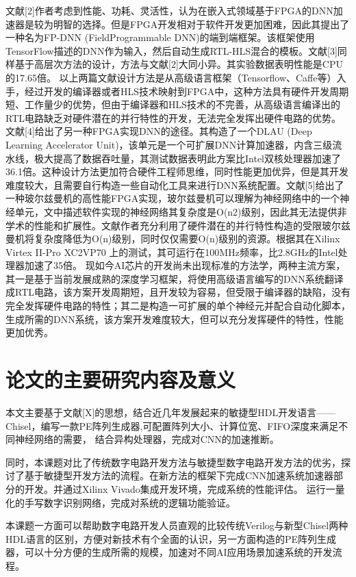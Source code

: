     文献[2]作者考虑到性能、功耗、灵活性，认为在嵌入式领域基于FPGA的DNN加速器是较为明智的选择。但是FPGA开发相对于软件开发更加困难，因此其提出了一种名为FP-DNN (FieldProgrammable DNN)的端到端框架。该框架使用TensorFlow描述的DNN作为输入，然后自动生成RTL-HLS混合的模板。文献[3]同样基于高层次方法的设计，方法与文献[2]大同小异。其实验数据表明性能是CPU的17.65倍。
    以上两篇文献设计方法是从高级语言框架（Tensorflow、Caffe等）入手，经过开发的编译器或者HLS技术映射到FPGA中，这种方法具有硬件开发周期短、工作量少的优势，但由于编译器和HLS技术的不完善，从高级语言编译出的RTL电路缺乏对硬件潜在的并行特性的开发，无法完全发挥出硬件电路的优势。
    文献[4]给出了另一种FPGA实现DNN的途径。其构造了一个DLAU (Deep Learning Accelerator Unit)，该单元是一个可扩展DNN计算加速器，内含三级流水线，极大提高了数据吞吐量，其测试数据表明此方案比Intel双核处理器加速了36.1倍。这种设计方法更加符合硬件工程师思维，同时性能更加优异，但是其开发难度较大，且需要自行构造一些自动化工具来进行DNN系统配置。文献[5]给出了一种玻尔兹曼机的高性能FPGA实现，玻尔兹曼机可以理解为神经网络中的一个神经单元，文中描述软件实现的神经网络其复杂度是O(n2)级别，因此其无法提供非学术的性能和扩展性。文献作者充分利用了硬件潜在的并行特性构造的受限玻尔兹曼机将复杂度降低为O(n)级别，同时仅仅需要O(n)级别的资源。根据其在Xilinx Virtex II-Pro XC2VP70 上的测试，其可运行在100MHz频率，比2.8GHz的Intel处理器加速了35倍。
    现如今AI芯片的开发尚未出现标准的方法学，两种主流方案，其一是基于当前发展成熟的深度学习框架，将使用高级语言编写的DNN系统翻译成RTL电路，该方案开发周期短，且开发较为容易，但受限于编译器的缺陷，没有完全发挥硬件电路的特性；其二是构造一可扩展的单个神经元并配合自动化脚本，生成所需的DNN系统，该方案开发难度较大，但可以充分发挥硬件的特性，性能更加优秀。

\section{论文的主要研究内容及意义}
    本文主要基于文献[X]的思想，结合近几年发展起来的敏捷型HDL开发语言——Chisel，编写一款PE阵列生成器,可配置阵列大小、计算位宽、FIFO深度来满足不同神经网络的需要，
    结合异构处理器，完成对CNN的加速推断。

    同时，本课题对比了传统数字电路开发方法与敏捷型数字电路开发方法的优劣，探讨了基于敏捷型开发方法的流程。在新方法的框架下完成CNN加速系统加速器部分的开发。并通过Xilinx Vivado集成开发环境，完成系统的性能评估。
    运行一量化的手写数字识别网络，完成对系统的逻辑功能验证。

    本课题一方面可以帮助数字电路开发人员直观的比较传统Verilog与新型Chisel两种HDL语言的区别，方便对新技术有个全面的认识，另一方面构造的PE阵列生成器，可以十分方便的生成所需的规模，加速对不同AI应用场景加速系统的开发流程。

